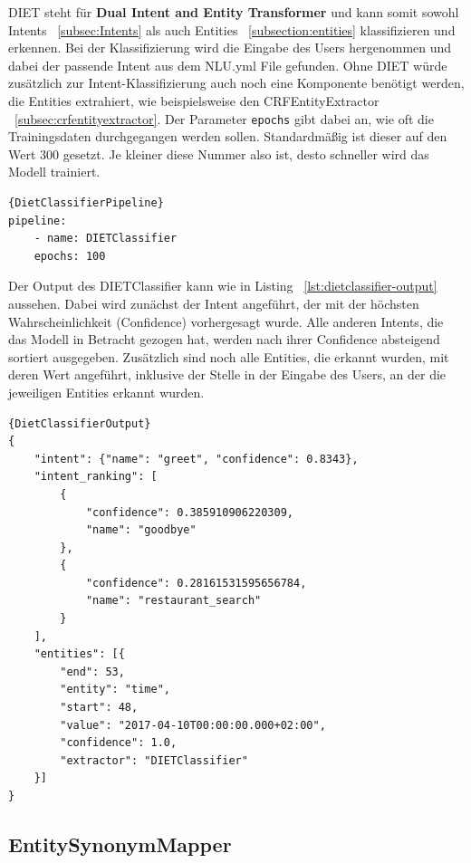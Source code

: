 DIET steht für \textbf{Dual Intent and Entity Transformer} und kann somit sowohl Intents ~\ref{subsec:Intents} als auch Entities ~\ref{subsection:entities} klassifizieren und erkennen.
Bei der Klassifizierung wird die Eingabe des Users hergenommen und dabei der passende Intent aus dem NLU.yml File gefunden.
Ohne DIET würde zusätzlich zur Intent-Klassifizierung auch noch eine Komponente benötigt werden, die Entities extrahiert, wie beispielsweise den CRFEntityExtractor ~\ref{subsec:crfentityextractor}.
Der Parameter \texttt{epochs} gibt dabei an, wie oft die Trainingsdaten durchgegangen werden sollen.
Standardmäßig ist dieser auf den Wert 300 gesetzt.
Je kleiner diese Nummer also ist, desto schneller wird das Modell trainiert.\cite{dietClassifier}

\begin{lstlisting}[label={lst:dietclassifier-pipeline},caption={DietClassifier in Pipeline}]{DietClassifierPipeline}
pipeline:
    - name: DIETClassifier
    epochs: 100
\end{lstlisting}

Der Output des DIETClassifier kann wie in Listing ~\ref{lst:dietclassifier-output} aussehen.
Dabei wird zunächst der Intent angeführt, der mit der höchsten Wahrscheinlichkeit (Confidence) vorhergesagt wurde.
Alle anderen Intents, die das Modell in Betracht gezogen hat, werden nach ihrer Confidence absteigend sortiert ausgegeben.
Zusätzlich sind noch alle Entities, die erkannt wurden, mit deren Wert angeführt, inklusive der Stelle in der Eingabe des Users, an der die jeweiligen Entities erkannt wurden.

\begin{lstlisting}[label={lst:dietclassifier-output},caption={Output des DIETClassifiers ~\cite{dietClassifier}}]{DietClassifierOutput}
{
    "intent": {"name": "greet", "confidence": 0.8343},
    "intent_ranking": [
        {
            "confidence": 0.385910906220309,
            "name": "goodbye"
        },
        {
            "confidence": 0.28161531595656784,
            "name": "restaurant_search"
        }
    ],
    "entities": [{
        "end": 53,
        "entity": "time",
        "start": 48,
        "value": "2017-04-10T00:00:00.000+02:00",
        "confidence": 1.0,
        "extractor": "DIETClassifier"
    }]
}
\end{lstlisting}

\subsection{EntitySynonymMapper}\label{subsec:entitysynonymmapper}

